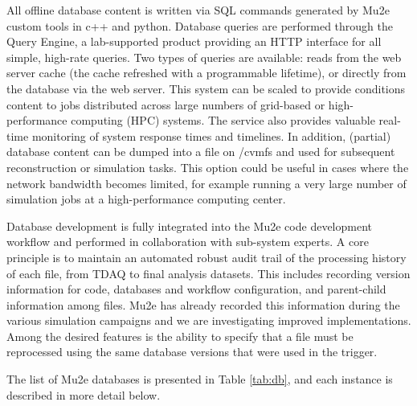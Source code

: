 All offline database content is written via SQL commands generated by Mu2e custom tools in c++ and python. Database queries are performed through the Query Engine, a lab-supported product providing an HTTP interface for all simple, high-rate queries. Two types of queries are available: reads from the web server cache (the cache refreshed with a programmable lifetime), or directly from the database via the web server. This system can be scaled to provide conditions content to jobs distributed across large numbers of grid-based or high-performance computing (HPC) systems. The service also provides valuable real-time monitoring of system response times and timelines. In addition, (partial) database content can be dumped into a file on /cvmfs and used for subsequent reconstruction or simulation tasks. This option could be useful in cases where the network bandwidth becomes limited, for example running a very large number of simulation jobs at a high-performance computing center.  

Database development is fully integrated into the Mu2e code development workflow and performed in collaboration with sub-system experts. A core principle is to maintain an automated robust audit trail of the processing history of each file, from TDAQ to final analysis datasets. This includes recording version information for code, databases and workflow configuration, and parent-child information among files. Mu2e has already recorded this information during the various simulation campaigns and we are investigating improved implementations. Among the desired features is the ability to specify that a file must be reprocessed using the same database versions that were used in the trigger.

The list of Mu2e databases is presented in Table \ref{tab:db}, and each instance is described in more detail below. 


